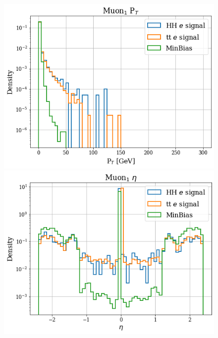 \documentclass[../main.tex]{subfiles}
\begin{document}
\begin{figure}[!ht]
  \begin{minipage}[b]{0.33\linewidth}
    \centering
    \includegraphics[width=1\linewidth]{Chapters/Plots/Hist_1ele_muon1_Pt.png}
  \end{minipage}%
  \begin{minipage}[b]{0.33\linewidth}
    \centering
    \includegraphics[width=1\linewidth]{Chapters/Plots/Hist_1ele_muon1_Eta.png}
  \end{minipage} %
  \begin{minipage}[b]{0.33\linewidth}

\end{minipage}
\end{figure}
\end{document}
